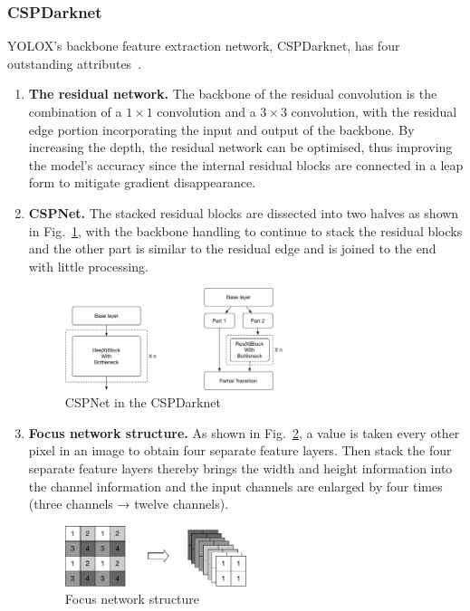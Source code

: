 \subsubsection{CSPDarknet}
YOLOX's backbone feature extraction network, CSPDarknet, has four outstanding attributes~\citep{Ge2021}.
\begin{enumerate}
    \item \textbf{The residual network.} The backbone of the residual convolution is the combination of a $1\times 1$ convolution and a $3\times 3$ convolution, with the residual edge portion incorporating the input and output of the backbone. By increasing the depth, the residual network can be optimised, thus improving the model's accuracy since the internal residual blocks are connected in a leap form to mitigate gradient disappearance. 
    
    \item \textbf{CSPNet.} The stacked residual blocks are dissected into two halves as shown in Fig.~\ref{fig:CSPnet}, with the backbone handling to continue to stack the residual blocks and the other part is similar to the residual edge and is joined to the end with little processing.
    
        \begin{figure}[htb]
            \centering
            \includegraphics[width=0.6\textwidth]{images/Fig 4.7.pdf}
            \caption{CSPNet in the CSPDarknet}
            \label{fig:CSPnet}
        \end{figure}
    
    \item \textbf{Focus network structure.} As shown in Fig.~\ref{fig:Focus}, a value is taken every other pixel in an image to obtain four separate feature layers. Then stack the four separate feature layers thereby brings the width and height information into the channel information and the input channels are enlarged by four times (three channels → twelve channels).
    
        \begin{figure}[htb]
            \centering
            \includegraphics[width=0.5\textwidth]{images/Fig 4.8.pdf}
            \caption{Focus network structure}
            \label{fig:Focus}
        \end{figure}
    

\end{enumerate}
